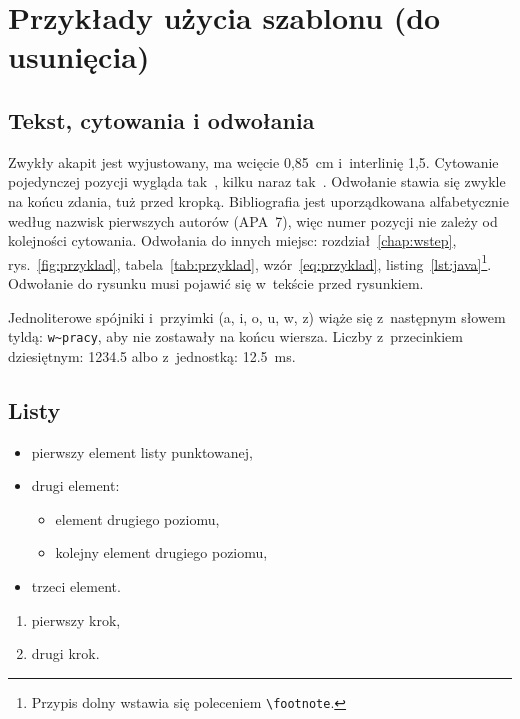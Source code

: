 \chapter{Przykłady użycia szablonu (do usunięcia)}
\label{chap:przyklady}

\section{Tekst, cytowania i odwołania}

Zwykły akapit jest wyjustowany, ma wcięcie 0,85~cm i~interlinię 1,5. Cytowanie pojedynczej
pozycji wygląda tak~\cite{przyklad-ksiazka}, kilku naraz tak~\cite{przyklad-artykul,
przyklad-konferencja,przyklad-www,przyklad-rozdzial}. Odwołanie stawia się zwykle na końcu zdania,
tuż przed kropką. Bibliografia jest uporządkowana alfabetycznie według nazwisk pierwszych autorów
(APA~7), więc numer pozycji nie zależy od kolejności cytowania. Odwołania do innych miejsc:
rozdział~\ref{chap:wstep}, rys.~\ref{fig:przyklad}, tabela~\ref{tab:przyklad},
wzór~\eqref{eq:przyklad}, listing~\ref{lst:java}\footnote{Przypis dolny wstawia się poleceniem
\texttt{\textbackslash footnote}.}. Odwołanie do rysunku musi pojawić się w~tekście przed
rysunkiem.

Jednoliterowe spójniki i~przyimki (a, i, o, u, w, z) wiąże się z~następnym słowem tyldą:
\texttt{w\textasciitilde{}pracy}, aby nie zostawały na końcu wiersza. Liczby z~przecinkiem
dziesiętnym: \num{1234.5} albo z~jednostką: \SI{12.5}{\milli\second}.

\section{Listy}

\begin{itemize}
  \item pierwszy element listy punktowanej,
  \item drugi element:
  \begin{itemize}
    \item element drugiego poziomu,
    \item kolejny element drugiego poziomu,
  \end{itemize}
  \item trzeci element.
\end{itemize}

\begin{enumerate}
  \item pierwszy krok,
  \item drugi krok.
\end{enumerate}


